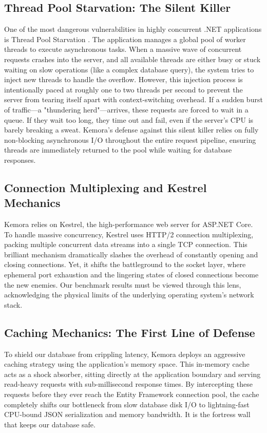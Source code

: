\subsection{Thread Pool Starvation: The Silent Killer}
One of the most dangerous vulnerabilities in highly concurrent .NET applications is Thread Pool Starvation \cite{thread_pool_starvation}. The application manages a global pool of worker threads to execute asynchronous tasks. When a massive wave of concurrent requests crashes into the server, and all available threads are either busy or stuck waiting on slow operations (like a complex database query), the system tries to inject new threads to handle the overflow. 
However, this injection process is intentionally paced at roughly one to two threads per second to prevent the server from tearing itself apart with context-switching overhead. If a sudden burst of traffic—a "thundering herd"—arrives, these requests are forced to wait in a queue. If they wait too long, they time out and fail, even if the server's CPU is barely breaking a sweat. Kemora's defense against this silent killer relies on fully non-blocking asynchronous I/O throughout the entire request pipeline, ensuring threads are immediately returned to the pool while waiting for database responses.

\subsection{Connection Multiplexing and Kestrel Mechanics}
Kemora relies on Kestrel, the high-performance web server for ASP.NET Core. To handle massive concurrency, Kestrel uses HTTP/2 connection multiplexing, packing multiple concurrent data streams into a single TCP connection. This brilliant mechanism dramatically slashes the overhead of constantly opening and closing connections. Yet, it shifts the battleground to the socket layer, where ephemeral port exhaustion and the lingering states of closed connections become the new enemies. Our benchmark results must be viewed through this lens, acknowledging the physical limits of the underlying operating system's network stack.

\subsection{Caching Mechanics: The First Line of Defense}
To shield our database from crippling latency, Kemora deploys an aggressive caching strategy using the application's memory space. This in-memory cache acts as a shock absorber, sitting directly at the application boundary and serving read-heavy requests with sub-millisecond response times. By intercepting these requests before they ever reach the Entity Framework connection pool, the cache completely shifts our bottleneck from slow database disk I/O to lightning-fast CPU-bound JSON serialization and memory bandwidth. It is the fortress wall that keeps our database safe.


